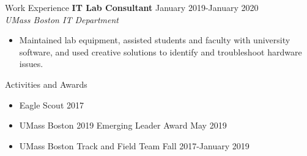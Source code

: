 \documentclass{resume} %
\begin{document}
\begin{Section}{Work Experience}
	\textbf{IT Lab Consultant} \hfill{January 2019-January 2020} \\
	\textit{UMass Boston IT Department}
	\begin{itemize}[leftmargin=*]
		\itemsep -0.5em \vspace{-0.5em}
		\item Maintained lab equipment, assisted students and faculty with university software, and used creative solutions to identify and troubleshoot hardware issues.
	\end{itemize}
	
	
	
\end{Section}

\begin{Section}{Activities and Awards} \itemsep -3pt
	\begin{itemize}[leftmargin=*]
		\itemsep -0.5em
		\item Eagle Scout \hfill {2017}
		\item UMass Boston 2019 Emerging Leader Award \hfill {May 2019}
		\item UMass Boston Track and Field Team \hfill {Fall 2017-January 2019} 
	\end{itemize}
\end{Section}
\end{document}
